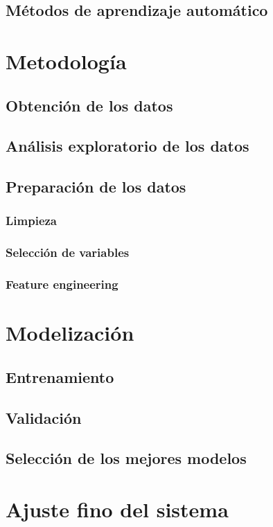 \documentclass[11pt,a4paper]{article}
\begin{document}
\subsection{Métodos de aprendizaje automático}

\section{Metodología}
\subsection{Obtención de los datos}
\subsection{Análisis exploratorio de los datos}
\subsection{Preparación de los datos}
\subsubsection{Limpieza}
\subsubsection{Selección de variables}
\subsubsection{Feature engineering}

\section{Modelización}
\subsection{Entrenamiento}
\subsection{Validación}
\subsection{Selección de los mejores modelos}

\section{Ajuste fino del sistema}
\end{document}

